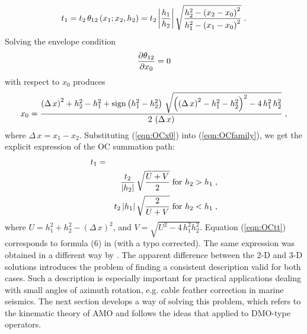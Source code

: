 \begin{equation}
t_1=t_2\,\theta_{12}\left(x_1;x_2, h_2\right) =
t_2\,{\left| h_1 \over h_2\right|}\,
\sqrt{ {h_2^2-\left(x_2-x_0\right)^2} \over
{h_1^2-\left(x_1-x_0\right)^2}}\;.
\label{eqn:OCfamily}
\end{equation} 
Solving the envelope condition
\begin{equation}
{\partial \theta_{12} \over \partial x_0}=0
\label{eqn:OCenvelop}
\end{equation}
with respect to $x_0$ produces
\begin{equation}
x_0={{\left(\Delta\,x\right)^2+h_2^2-h_1^2+
\mbox{sign}\left(h_1^2-h_2^2\right)\,
\sqrt{\left(\left(\Delta\,x\right)^2-h_1^2-h_2^2\right)^2-4\,h_1^2\,h_2^2}}
\over {2\,\left(\Delta\,x\right)}}\;,
\label{eqn:OCx0}
\end{equation}
where $\Delta\,x=x_1-x_2$.
Substituting (\ref{eqn:OCx0}) into (\ref{eqn:OCfamily}), we get the explicit
expression of the OC summation path:
\begin{eqnarray}
t_1 & = & \nonumber \\
& & {t_2 \over \left|h_2\right|}\,\sqrt{{U+V} \over 2}
\;\mbox{for $h_2 > h_1$}\;, \nonumber \\
& & {t_2 \left|h_1\right|}\,\sqrt{2 \over {U+V}}
\;\mbox{for $h_2 < h_1$}\;, 
\label{eqn:OCtt}
\end{eqnarray}  
where $U=h_1^2+h_2^2-\left(\Delta\,x\right)^2$, and
$V=\sqrt{U^2-4\,h_1^2h_2^2}$.
Equation (\ref{eqn:OCtt}) corresponds to formula (6) in
\cite[]{Biondi.sep.80.125} (with a typo corrected). The same
expression was obtained in a different way by \cite{myDMO}. 
The apparent difference between the 2-D and 3-D solutions introduces the
problem of finding a consistent description valid for both cases.
Such a description is especially important for practical applications
dealing with small angles of azimuth rotation, e.g. cable feather
correction in marine seismics. The next section develops
a way of solving
this problem, which
refers to the kinematic theory of AMO and follows the ideas that
\cite{GPR29-03-03740406} applied
to DMO-type operators.


